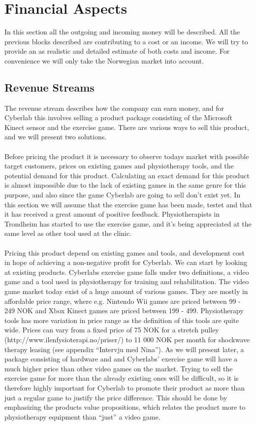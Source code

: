 \section{Financial Aspects}
In this section all the outgoing and incoming money will be described. All the previous blocks described are contributing to a cost or an income. We will try to provide an as realistic and detailed estimate of both costs and income. For convenience we will only take the Norwegian market into account. 
\subsection{Revenue Streams}
The revenue stream describes how the company can earn money, and for Cyberlab this involves selling a product package consisting of the Microsoft Kinect sensor and the exercise game. There are various ways to sell this product, and we will present two solutions.\\ \\
Before pricing the product it is necessary to observe todays market with possible target customers, prices on existing games and physiotherapy tools, and the potential demand for this product. Calculating an exact demand for this product is almost impossible due to the lack of existing games in the same genre for this purpose, and also since the game Cyberlab are going to sell don’t exist yet. In this section we will assume that the exercise game has been made, testet and that it has received a great amount of positive feedback. Physiotherapists in Trondheim has started to use the exercise game, and it’s being appreciated at the same level as other tool used at the clinic. \\ \\ 
Pricing this product depend on existing games and tools, and development cost in hope of achieving a non-negative profit for Cyberlab. We can start by looking at existing products. Cyberlabs exercise game falls under two definitions, a video game and a tool used in physiotherapy for training and rehabilitation. The video game market today exist of a huge amount of various games. They are mostly in affordable price range, where e.g. Nintendo Wii games are priced between 99 - 249 NOK and Xbox Kinect games are priced between 199 - 499. Physiotherapy tools has more variation in price range as the definition of this tools are quite wide. Prices can vary from a fixed price of 75 NOK for a stretch pulley (http://www.ilenfysioterapi.no/priser/)  to 11 000 NOK per month for shockwave therapy leasing (see appendix “Intervju med Nina”). As we will present later, a package consisting of hardware and and Cyberlabs’ exercise game will have a much higher price than other video games on the market. Trying to sell the exercise game for more than the already existing ones will be difficult, so it is therefore highly important for Cyberlab to promote their product as more than just a regular game to justify the price difference. This should be done by emphasizing the products value propositions, which relates the product more to physiotherapy equipment than “just” a video game. \\ \\
